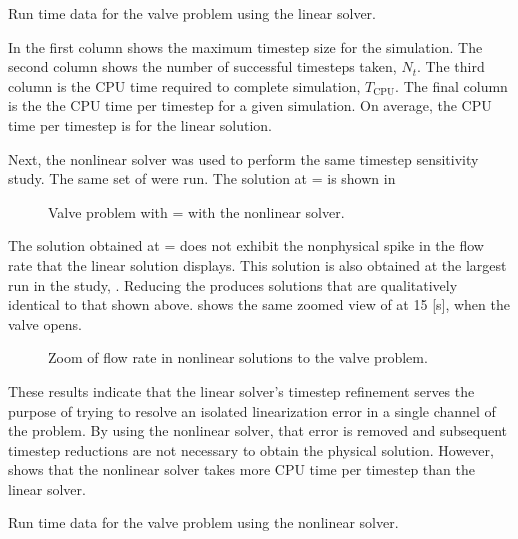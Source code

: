 \begin{table}[h!tb]
\centering
\singlespace

\caption{Run time data for the valve problem using the linear solver.}
\label{tab:valveLinTable}
\end{table}

In  the first column shows the maximum timestep size for the simulation.
The second column shows the number of successful timesteps taken, $N_{t}$.
The third column is the CPU time required to complete simulation, $T_{\text{CPU}}$.
The final column is the the CPU time per timestep for a given simulation.
On average, the CPU time per timestep is  for the linear solution.

Next, the nonlinear solver was used to perform the same timestep sensitivity study.
The same set of \dtmax{} were run.
The solution at \dtmax{} =  is shown in 

\begin{figure}[h!tb]
\centering

\caption{Valve problem with \dtmax{} =  with the nonlinear solver.}
\label{fig:valveNln6pt25em02}
\end{figure}

The solution obtained at \dtmax{} =  does not exhibit the nonphysical spike in the flow rate that the linear solution displays.
This solution is also obtained at the largest \dt{} run in the study, .
Reducing the \dtmax{} produces solutions that are qualitatively identical to that shown above.
 shows the same zoomed view of at 15 [s], when the valve opens.

\begin{figure}[h!tb]
\centering

\caption{Zoom of flow rate in nonlinear solutions to the valve problem.}
\label{fig:valveNlnSols}
\end{figure}

These results indicate that the linear solver's timestep refinement serves the purpose of trying to resolve an isolated linearization error in a single channel of the problem.
By using the nonlinear solver, that error is removed and subsequent timestep reductions are not necessary to obtain the physical solution.
However,  shows that the nonlinear solver takes more CPU time per timestep than the linear solver.

\begin{table}[h!tb]
\centering
\singlespace

\caption{Run time data for the valve problem using the nonlinear solver.}
\label{tab:valveNlnTable}
\end{table}

